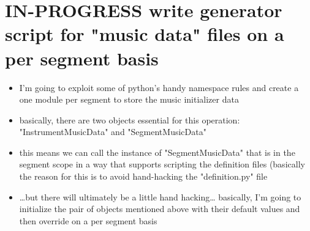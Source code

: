 \documentclass[11pt]{article}
\begin{document}
\section*{{\bfseries\sffamily IN-PROGRESS} write generator script for "music data" files on a per segment basis}
\label{sec:org2d492e7}
\begin{itemize}
\item I'm going to exploit some of python's handy namespace rules and create a one module per segment to store the music initializer data
\item basically, there are two objects essential for this operation: "InstrumentMusicData" and "SegmentMusicData"
\item this means we can call the instance of "SegmentMusicData" that is in the segment scope in a way that supports scripting the definition files (basically the reason for this is to avoid hand-hacking the "definition.py" file
\item \ldots{}but there will ultimately be a little hand hacking\ldots{} basically, I'm going to initialize the pair of objects mentioned above with their default values and then override on a per segment basis
\end{itemize}
\end{document}
